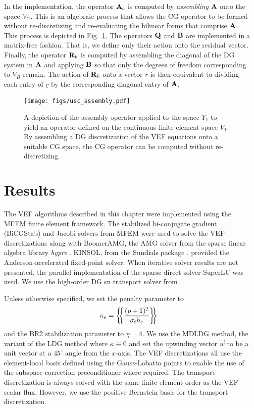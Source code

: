 \documentclass[../doc.tex]{subfiles}
\begin{document}
In the implementation, the operator $\boldsymbol{\mathrm{A}}_c$ is computed by \emph{assembling} $\boldsymbol{\mathrm{A}}$ onto the space $V_C$. This is an algebraic process that allows the CG operator to be formed without re-discretizing and re-evaluating the bilinear forms that comprise $\boldsymbol{\mathrm{A}}$. This process is depicted in Fig.~\ref{dgvef:usc_assembly}. The operators $\boldsymbol{\mathrm{Q}}$ and $\boldsymbol{\mathrm{B}}$ are implemented in a matrix-free fashion. That is, we define only their action onto the residual vector. Finally, the operator $\boldsymbol{\mathrm{R}}_b$ is computed by assembling the diagonal of the DG system in $\boldsymbol{\mathrm{A}}$ and applying $\boldsymbol{\mathrm{B}}$ so that only the degrees of freedom corresponding to $V_B$ remain. The action of $\boldsymbol{\mathrm{R}}_b$ onto a vector $\underline{r}$ is then equivalent to dividing each entry of $\underline{r}$ by the corresponding diagonal entry of $\boldsymbol{\mathrm{A}}$.

\begin{figure}
\centering
\texttt{[image: figs/usc\_assembly.pdf]}
\caption{A depiction of the assembly operator applied to the space $Y_1$ to yield an operator defined on the continuous finite element space $V_1$. By assembling a DG discretization of the VEF equations onto a suitable CG space, the CG operator can be computed without re-discretizing.}
\label{dgvef:usc_assembly}
\end{figure}

\section{Results}
The VEF algorithms described in this chapter were implemented using the MFEM \cite{MFEM,mfem-web} finite element framework. The stabilized bi-conjugate gradient (BiCGStab) and Jacobi solvers from MFEM were used to solve the VEF discretizations along with BoomerAMG, the AMG solver from the sparse linear algebra library \emph{hypre} \cite{hypre}. KINSOL, from the Sundials package \cite{hindmarsh2005sundials}, provided the Anderson-accelerated fixed-point solver. When iterative solver results are not presented, the parallel implementation of the sparse direct solver SuperLU \cite{lidemmel03} was used. We use the high-order DG \gls{sn} transport solver from \cite{graph_sweeps}.

Unless otherwise specified, we set the penalty parameter to 
	\begin{equation}
		\kappa_e = \left\{\!\!\left\{\frac{(p+1)^2}{\sigma_t h_e}\right\}\!\!\right\} 
	\end{equation}
and the BR2 stabilization parameter to $\eta = 4$. We use the MDLDG method, the variant of the LDG method where $\kappa \equiv 0$ and set the upwinding vector $\vec{w}$ to be a unit vector at a $45^\circ$ angle from the $x$-axis. The VEF discretizations all use the element-local basis defined using the Gauss-Lobatto points to enable the use of the subspace correction preconditioner where required. The transport discretization is always solved with the same finite element order as the VEF scalar flux. However, we use the positive Bernstein basis \cite{doi:10.1137/11082539X} for the transport discretization. 
\end{document}

